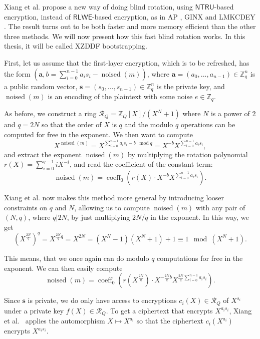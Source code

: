 Xiang et al. \cite{cite:fast_bootstrap_crypto23} propose a new way of doing blind rotation, using $\mathsf{NTRU}$-based encryption, instead of $\mathsf{RLWE}$-based encryption, as in AP \cite{cite:ap}, GINX \cite{cite:ginx} and LMKCDEY \cite{cite:lmkcdey_le_et_al_better_ap_ginx}. The result turns out to be both faster and more memory efficient than the other three methods. We will now present how this fast blind rotation works. In this thesis, it will be called XZDDF bootstrapping.

First, let us assume that the first-layer encryption, which is to be refreshed, has the form $(\mathbf{a}, b=\sum_{i=0}^{n-1}a_is_i - \operatorname{noised}(m))$, where $\mathbf{a} = (a_0, ..., a_{n-1}) \in \mathbb{Z}_q^n$ is a public random vector, $\mathbf{s} = (s_0, ..., s_{n-1}) \in \mathbb{Z}_q^n$ is the private key, and $\operatorname{noised}(m)$ is an encoding of the plaintext with some noise $e \in \mathbb{Z}_q$.

As before, we construct a ring $\mathcal{R}_Q = \mathbb{Z}_Q[X]/(X^N+1)$ where $N$ is a power of 2 and $q=2N$ so that the order of $X$ is $q$ and the modulo $q$ operations can be computed for free in the exponent. We then want to compute
$$X^{\operatorname{noised}(m)} = X^{\sum_{i=0}^{n-1}a_is_i -b \operatorname{\;\;mod} q} = X^{-b} X^{\sum_{i=0}^{n-1}a_is_i},$$
and extract the exponent $\operatorname{noised}(m)$ by multiplying the rotation polynomial \linebreak $r(X) = \sum_{i=0}^{q-1} iX^{-i}$, and read the coefficient of the constant term:
$$ \operatorname{noised}(m) = \operatorname{coeff}_0 \left(r(X) \cdot X^{-b} X^{\sum_{i=0}^{n-1}a_is_i}\right)   .$$

Xiang et al. \cite{cite:fast_bootstrap_crypto23} now makes this method more general by introducing looser constraints on $q$ and $N$, allowing us to compute $\operatorname{noised}(m)$ with any pair of $(N, q)$, where $q | 2N$, by just multiplying $2N/q$ in the exponent. In this way, we get
$$\left(X^{\frac{2N}{q}}\right)^q = X^{\frac{2N}{q}q} = X^{2N} = (X^N-1)(X^N+1)+1 \equiv 1 \mod (X^N+1).$$

This means, that we once again can do modulo $q$ computations for free in the exponent. We can then easily compute
$$ \operatorname{noised}(m) = \operatorname{coeff}_0 \left(r(X^{\frac{2N}{q}}) \cdot X^{-\frac{2N}{q}b} X^{\frac{2N}{q}\sum_{i=0}^{n-1}a_is_i}\right) .$$

Since $\mathbf{s}$ is private, we do only have access to encryptions $c_i(X) \in \mathcal{R}_Q$ of $X^{s_i}$ under a private key $f(X) \in \mathcal{R}_Q$. To get a ciphertext that encrypts $X^{a_is_i}$, Xiang et al.~\cite{cite:fast_bootstrap_crypto23} applies the automorphism $X \mapsto X^{a_i}$ so that the ciphertext $c_i(X^{a_i})$ encrypts $X^{a_is_i}$.

